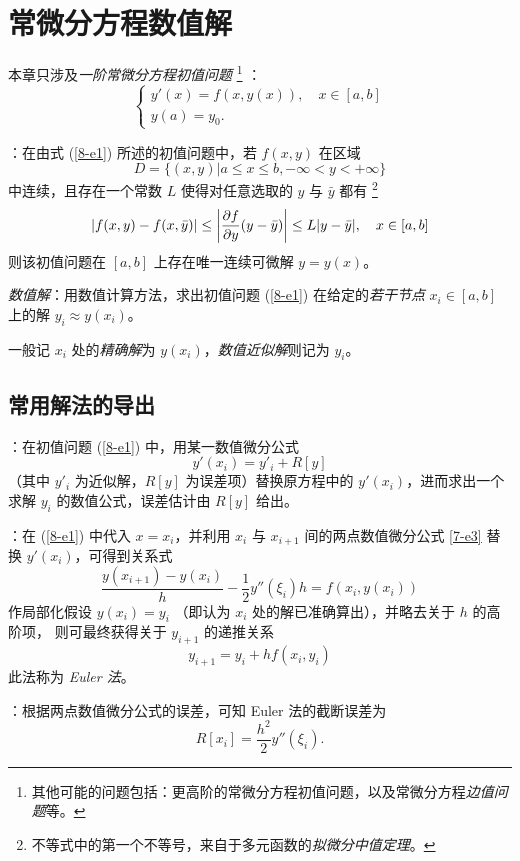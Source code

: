 \chapter{常微分方程数值解}
\entry 本章只涉及\emph{一阶常微分方程初值问题}
\footnote{其他可能的问题包括：更高阶的常微分方程初值问题，以及常微分方程\emph{边值问题}等。}
：
\begin{equation}\label{8-e1}
\begin{cases}
y'(x)=f(x,y(x)),\quad x\in[a,b]\\
y(a)=y_0.
\end{cases}
\end{equation}

\trm {}：在由式 (\ref{8-e1}) 所述的初值问题中，若 $f(x,y)$ 在区域
\[D=\{(x,y)|a\leq x\leq b,-\infty<y<+\infty\}\]
中连续，且存在一个常数 $L$ 使得对任意选取的 $y$ 与 $\bar{y}$ 都有
\footnote{不等式中的第一个不等号，来自于多元函数的\emph{拟微分中值定理}。}
\[ |f(x,y)-f(x,\bar{y})|\leq\left|\frac{\partial f}{\partial y}(y-\bar{y})\right|\leq L|y-\bar{y}|,
\quad x\in[a,b] \]
则该初值问题在 $[a,b]$ 上存在唯一连续可微解 $y=y(x)$。

\entry \emph{数值解}：用数值计算方法，求出初值问题 (\ref{8-e1}) 在给定的\emph{若干节点} $x_i\in[a,b]$ 上的解 $y_i\approx y(x_i)$。

\entry 一般记 $x_i$ 处的\emph{精确解}为 $y(x_i)$，\emph{数值近似解}则记为
$y_i$。

\section{常用解法的导出}
\entry {}：在初值问题 (\ref{8-e1}) 中，用某一数值微分公式
\[ y'(x_i)=y'_i+R[y] \]
（其中 $y'_i$ 为近似解，$R[y]$ 为误差项）替换原方程中的 $y'(x_i)$，进而求出一个求解 $y_i$ 的数值公式，误差估计由 $R[y]$ 给出。

\entry {}：在 (\ref{8-e1}) 中代入 $x=x_i$，并利用 $x_i$ 与 $x_{i+1}$ 间的两点数值微分公式 \eqref{7-e3} 替换 $y'(x_i)$，可得到关系式
\[ \frac{y(x_{i+1})-y(x_i)}{h}-\frac12y''(\xi_i)h=f(x_i,y(x_i)) \]
作局部化假设 $y(x_i)=y_i$ （即认为 $x_i$ 处的解已准确算出），并略去关于 $h$ 的高阶项，
则可最终获得关于 $y_{i+1}$ 的递推关系
\begin{equation}
y_{i+1}=y_i+hf(x_i,y_i)
\end{equation}
此法称为 \emph{Euler 法}。

\entry {}：根据两点数值微分公式的误差，可知 Euler 法的截断误差为
\begin{equation}
R[x_i]=\frac{h^2}2y''(\xi_i).
\end{equation}

